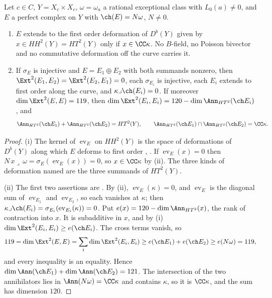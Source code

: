 \begin{corollary}
\label{cor:mumfordsplit}
Let $c\in C$, $Y=X_{c}\times X_{c}$, $\omega=\omega_{a}$ a rational
exceptional class with $L_{0}(a)\ne0$, and $E$ a perfect complex on $Y$ with
$\ch(E)=N\omega$, $N\ne0$.
\begin{enumerate}[label=\textup{(\roman*)},leftmargin=2.6em,itemsep=2pt]
\item $E$ extends to the first order deformation of $D^{b}(Y)$ given by
  $x\in HH^{2}(Y)=HT^{2}(Y)$ only if $x\in\CC\kappa$. No $B$-field, no
  Poisson bivector and no commutative deformation off the curve carries it.
\item If $\sigma_{E}$ is injective and $E=E_{1}\oplus E_{2}$ with both
  summands nonzero, then $\Ext^{2}(E_{1},E_{2})=\Ext^{2}(E_{2},E_{1})=0$, each
  $\sigma_{E_{i}}$ is injective, each $E_{i}$ extends to first order along the
  curve, and $\kappa\lrcorner\ch(E_{i})=0$. If moreover
  $\dim\Ext^{2}(E,E)=119$, then $\dim\Ext^{2}(E_{i},E_{i})=
  120-\dim\Ann_{HT^{2}}(\ch E_{i})$, and
  \[
    \Ann_{HT^{2}}(\ch E_{1})+\Ann_{HT^{2}}(\ch E_{2})=HT^{2}(Y),\qquad
    \Ann_{HT^{2}}(\ch E_{1})\cap\Ann_{HT^{2}}(\ch E_{2})=\CC\kappa .
  \]
\end{enumerate}
\end{corollary}

\begin{proof}
(i) The kernel of $\operatorname{ev}_{E}$ on $HH^{2}(Y)$ is the space of
deformations of $D^{b}(Y)$ along which $E$ deforms to first order
\cite{Tod09}, \cite[Section~8.3]{Mar25a}. If $\operatorname{ev}_{E}(x)=0$ then
$N\,x\lrcorner\,\omega=\sigma_{E}(\operatorname{ev}_{E}(x))=0$, so
$x\in\CC\kappa$ by (ii). The three kinds of
deformation named are the three summands of $HT^{2}(Y)$.

(ii) The first two assertions are . By
(ii), $\operatorname{ev}_{E}(\kappa)=0$, and
$\operatorname{ev}_{E}$ is the diagonal sum of $\operatorname{ev}_{E_{1}}$
and $\operatorname{ev}_{E_{2}}$, so each vanishes at $\kappa$; then
$\kappa\lrcorner\ch(E_{i})=\sigma_{E_{i}}(\operatorname{ev}_{E_{i}}(\kappa))
=0$. Put $e(x)=120-\dim\Ann_{HT^{2}}(x)$, the rank of contraction into $x$.
It is subadditive in $x$, and by (i)
$\dim\Ext^{2}(E_{i},E_{i})\ge e(\ch E_{i})$. The cross terms vanish, so
\[
  119=\dim\Ext^{2}(E,E)=\sum_{i}\dim\Ext^{2}(E_{i},E_{i})
  \ge e(\ch E_{1})+e(\ch E_{2})\ge e(N\omega)=119,
\]
and every inequality is an equality. Hence
$\dim\Ann(\ch E_{1})+\dim\Ann(\ch E_{2})=121$. The intersection of the two
annihilators lies in $\Ann(N\omega)=\CC\kappa$ and contains $\kappa$, so it is
$\CC\kappa$, and the sum has dimension $120$.
\end{proof}


